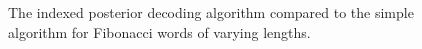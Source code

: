 \begin{figure}
  \centering
  
  \caption{The indexed posterior decoding algorithm compared to the simple
    algorithm for Fibonacci words of varying lengths.}
  \label{fig:indexed_posterior_fib_speedup_vs_T}
\end{figure}

